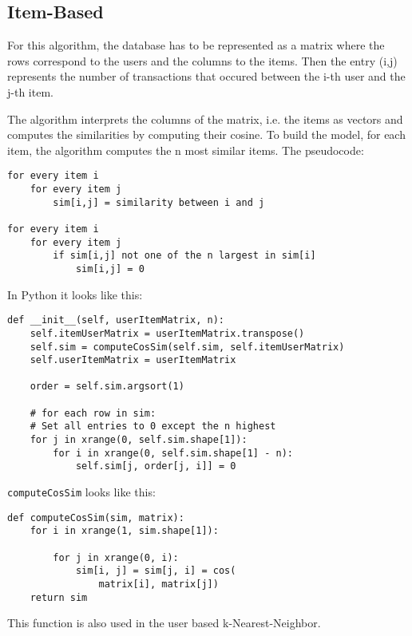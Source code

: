 \subsection{Item-Based}
\label{itembasedknn}

For this algorithm, the database has to be represented as a matrix
where the rows correspond to the users and the columns to the items.
Then the entry (i,j) represents the number of transactions that occured 
between the i-th user and the j-th item. 

The algorithm interprets the columns of the matrix, i.e. the items
as vectors and computes the similarities by computing their cosine.
To build the model, for each item, the algorithm computes the n most similar items. The pseudocode:
\begin{lstlisting}[style=pseudocode]
for every item i
    for every item j
        sim[i,j] = similarity between i and j

for every item i
    for every item j
        if sim[i,j] not one of the n largest in sim[i]
            sim[i,j] = 0
\end{lstlisting}
In Python it looks like this:
\begin{lstlisting}[style=python]
def __init__(self, userItemMatrix, n):
    self.itemUserMatrix = userItemMatrix.transpose()
    self.sim = computeCosSim(self.sim, self.itemUserMatrix)
    self.userItemMatrix = userItemMatrix

    order = self.sim.argsort(1)

    # for each row in sim:
    # Set all entries to 0 except the n highest
    for j in xrange(0, self.sim.shape[1]):
        for i in xrange(0, self.sim.shape[1] - n):
            self.sim[j, order[j, i]] = 0
\end{lstlisting}
\lstinline!computeCosSim! looks like this:
\begin{lstlisting}[style=python]
def computeCosSim(sim, matrix):
    for i in xrange(1, sim.shape[1]):

        for j in xrange(0, i):
            sim[i, j] = sim[j, i] = cos(
                matrix[i], matrix[j])
    return sim
\end{lstlisting}
This function is also used in the user based k-Nearest-Neighbor.


